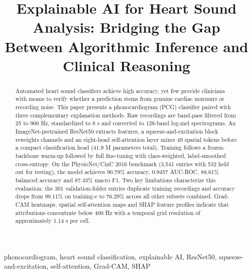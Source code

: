 \documentclass[conference]{IEEEtran}
\begin{document}
\title{Explainable AI for Heart Sound Analysis: Bridging the Gap Between Algorithmic Inference and Clinical Reasoning}

\author{
\and
{}
}

\maketitle

\begin{abstract}
Automated heart sound classifiers achieve high accuracy, yet few provide clinicians with means to verify whether a prediction stems from genuine cardiac murmurs or recording noise. This paper presents a phonocardiogram (PCG) classifier paired with three complementary explanation methods. Raw recordings are band-pass filtered from 25 to 900 Hz, standardized to 8 s and converted to 128-band log-mel spectrograms. An ImageNet-pretrained ResNet50 extracts features, a squeeze-and-excitation block reweights channels and an eight-head self-attention layer mixes 49 spatial tokens before a compact classification head (41.9 M parameters total). Training follows a frozen-backbone warm-up followed by full fine-tuning with class-weighted, label-smoothed cross-entropy. On the PhysioNet/CinC 2016 benchmark (3,541 entries with 532 held out for testing), the model achieves 90.79\% accuracy, 0.9457 AUC-ROC, 88.61\% balanced accuracy and 87.43\% macro F1. Two key limitations characterize this evaluation: the 301 validation-folder entries duplicate training recordings and accuracy drops from 99.11\% on training-e to 76.29\% across all other subsets combined. Grad-CAM heatmaps, spatial self-attention maps and SHAP feature profiles indicate that attributions concentrate below 400 Hz with a temporal grid resolution of approximately 1.14 s per cell.
\end{abstract}

\begin{IEEEkeywords}
phonocardiogram, heart sound classification, explainable AI, ResNet50, squeeze-and-excitation, self-attention, Grad-CAM, SHAP
\end{IEEEkeywords}
\end{document}
